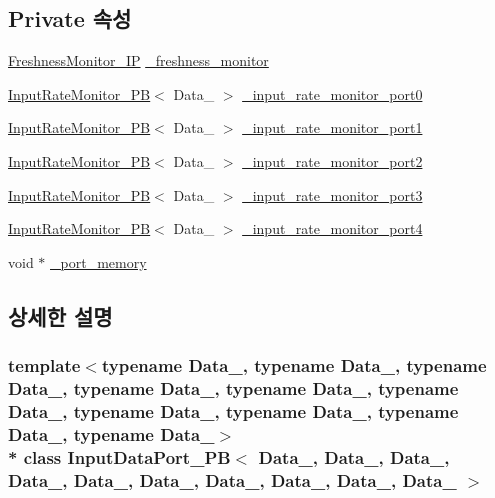 \subsection*{Private 속성}
\begin{DoxyCompactItemize}
\item 
\hyperlink{classFreshnessMonitor__IP}{Freshness\+Monitor\+\_\+\+IP} \hyperlink{classInputDataPort__PB_a38da6f4f194f3849420cdbcc5db2019a}{\+\_\+freshness\+\_\+monitor}
\item 
\hyperlink{classInputRateMonitor__PB}{Input\+Rate\+Monitor\+\_\+\+PB}$<$ Data\+\_ $>$ \hyperlink{classInputDataPort__PB_a652aab9b8981a0286167871600a11669}{\+\_\+input\+\_\+rate\+\_\+monitor\+\_\+port0}
\item 
\hyperlink{classInputRateMonitor__PB}{Input\+Rate\+Monitor\+\_\+\+PB}$<$ Data\+\_ $>$ \hyperlink{classInputDataPort__PB_acd3a6668805ad1a581ab741faa3245f1}{\+\_\+input\+\_\+rate\+\_\+monitor\+\_\+port1}
\item 
\hyperlink{classInputRateMonitor__PB}{Input\+Rate\+Monitor\+\_\+\+PB}$<$ Data\+\_ $>$ \hyperlink{classInputDataPort__PB_a9e3ee67f17eac2124e134f683292dfc5}{\+\_\+input\+\_\+rate\+\_\+monitor\+\_\+port2}
\item 
\hyperlink{classInputRateMonitor__PB}{Input\+Rate\+Monitor\+\_\+\+PB}$<$ Data\+\_ $>$ \hyperlink{classInputDataPort__PB_aaff08d79fb2328974a0da28ceca55233}{\+\_\+input\+\_\+rate\+\_\+monitor\+\_\+port3}
\item 
\hyperlink{classInputRateMonitor__PB}{Input\+Rate\+Monitor\+\_\+\+PB}$<$ Data\+\_ $>$ \hyperlink{classInputDataPort__PB_a00fa02ed776eae01fea1d37ce51dd4ab}{\+\_\+input\+\_\+rate\+\_\+monitor\+\_\+port4}
\item 
void $\ast$ \hyperlink{classInputDataPort__PB_aef86b1a63f7a759a9ed5c66bb36c6d47}{\+\_\+port\+\_\+memory}
\end{DoxyCompactItemize}


\subsection{상세한 설명}
\subsubsection*{template$<$typename Data\+\_, typename Data\+\_, typename Data\+\_, typename Data\+\_, typename Data\+\_, typename Data\+\_, typename Data\+\_, typename Data\+\_, typename Data\+\_, typename Data\+\_$>$\\*
class Input\+Data\+Port\+\_\+\+P\+B$<$ Data\+\_, Data\+\_, Data\+\_, Data\+\_, Data\+\_, Data\+\_, Data\+\_, Data\+\_, Data\+\_, Data\+\_ $>$}

